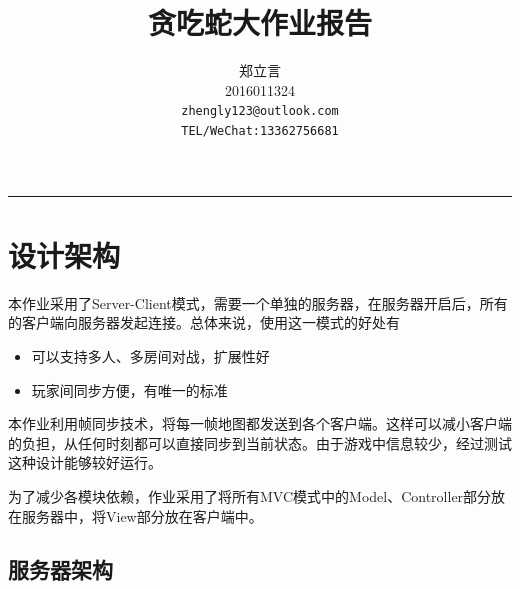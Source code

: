 \documentclass[12pt]{article}
\title{贪吃蛇大作业报告}
\author{郑立言 \\
	2016011324\\
	 \texttt{zhengly123@outlook.com}\\
	 \texttt{TEL/WeChat:13362756681}}
\begin{document}
  \maketitle
  \rule{\linewidth}{0.4pt}
  
  \section{设计架构}
  本作业采用了Server-Client模式，需要一个单独的服务器，在服务器开启后，所有的客户端向服务器发起连接。总体来说，使用这一模式的好处有
  \begin{itemize}
  	\item 可以支持多人、多房间对战，扩展性好
  	\item 玩家间同步方便，有唯一的标准
  \end{itemize}
  
  本作业利用帧同步技术，将每一帧地图都发送到各个客户端。这样可以减小客户端的负担，从任何时刻都可以直接同步到当前状态。由于游戏中信息较少，经过测试这种设计能够较好运行。
 
 为了减少各模块依赖，作业采用了将所有MVC模式中的Model、Controller部分放在服务器中，将View部分放在客户端中。
  
  \subsection*{服务器架构}
  
\end{document}
